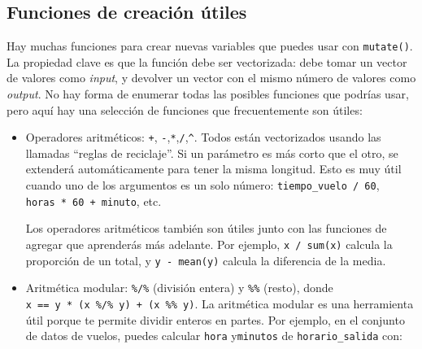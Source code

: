 \documentclass[11pt,oneside]{report}
\newenvironment{Shaded}{\begin{snugshade}}{\end{snugshade}}
\newcommand{\CommentTok}[1]{\textcolor[rgb]{0.56,0.35,0.01}{\textit{#1}}}
\newcommand{\DataTypeTok}[1]{\textcolor[rgb]{0.13,0.29,0.53}{#1}}
\newcommand{\DecValTok}[1]{\textcolor[rgb]{0.00,0.00,0.81}{#1}}
\newcommand{\KeywordTok}[1]{\textcolor[rgb]{0.13,0.29,0.53}{\textbf{#1}}}
\newcommand{\NormalTok}[1]{#1}
\newcommand{\OperatorTok}[1]{\textcolor[rgb]{0.81,0.36,0.00}{\textbf{#1}}}
\newcommand{\StringTok}[1]{\textcolor[rgb]{0.31,0.60,0.02}{#1}}
\begin{document}
\hypertarget{mutate-funs}{%
\subsection{Funciones de creación útiles}\label{mutate-funs}}

Hay muchas funciones para crear nuevas variables que puedes usar con
\texttt{mutate()}. La propiedad clave es que la función debe ser
vectorizada: debe tomar un vector de valores como \emph{input}, y
devolver un vector con el mismo número de valores como \emph{output}. No
hay forma de enumerar todas las posibles funciones que podrías usar,
pero aquí hay una selección de funciones que frecuentemente son útiles:

\begin{itemize}
\item
  Operadores aritméticos: \texttt{+},
  \texttt{-},\texttt{*},\texttt{/},\texttt{\^{}}. Todos están
  vectorizados usando las llamadas ``reglas de reciclaje''. Si un
  parámetro es más corto que el otro, se extenderá automáticamente para
  tener la misma longitud. Esto es muy útil cuando uno de los argumentos
  es un solo número: \texttt{tiempo\_vuelo\ /\ 60},
  \texttt{horas\ *\ 60\ +\ minuto}, etc.

  Los operadores aritméticos también son útiles junto con las funciones
  de agregar que aprenderás más adelante. Por ejemplo,
  \texttt{x\ /\ sum(x)} calcula la proporción de un total, y
  \texttt{y\ -\ mean(y)} calcula la diferencia de la media.
\item
  Aritmética modular: \texttt{\%/\%} (división entera) y \texttt{\%\%}
  (resto), donde \texttt{x\ ==\ y\ *\ (x\ \%/\%\ y)\ +\ (x\ \%\%\ y)}.
  La aritmética modular es una herramienta útil porque te permite
  dividir enteros en partes. Por ejemplo, en el conjunto de datos de
  vuelos, puedes calcular \texttt{hora} y\texttt{minutos} de
  \texttt{horario\_salida} con:
\end{itemize}

\begin{Shaded}
\end{Shaded}
\end{document}
